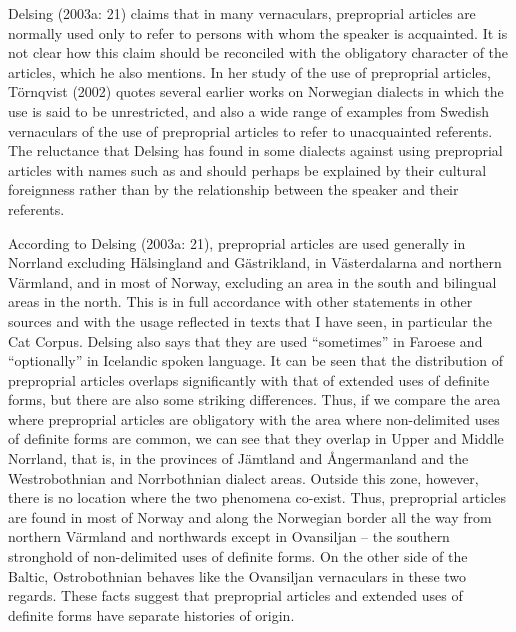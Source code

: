 Delsing (2003a: 21) claims that in many vernaculars, preproprial articles are normally used only to refer to persons with whom the speaker is acquainted. It is not clear how this claim should be reconciled with the obligatory character of the articles, which he also mentions. In her study of the use of preproprial articles, Törnqvist (2002) quotes several earlier works on Norwegian dialects in which the use is said to be unrestricted, and also a wide range of examples from Swedish vernaculars of the use of preproprial articles to refer to unacquainted referents. The reluctance that Delsing has found in some dialects against using preproprial articles with names such as  and  should perhaps be explained by their cultural foreignness rather than by the relationship between the speaker and their referents. 

According to Delsing (2003a: 21), preproprial articles are used generally in Norrland excluding Hälsingland and Gästrikland, in Västerdalarna and northern Värmland, and in most of Norway, excluding an area in the south and bilingual areas in the north. This is in full accordance with other statements in other sources and with the usage reflected in texts that I have seen, in particular the Cat Corpus. Delsing also says that they are used “sometimes” in Faroese and “optionally” in Icelandic spoken language. It can be seen that the distribution of preproprial articles overlaps significantly with that of extended uses of definite forms, but there are also some striking differences. Thus, if we compare the area where preproprial articles are obligatory with the area where non-delimited uses of definite forms are common, we can see that they overlap in Upper and Middle Norrland, that is, in the provinces of Jämtland and Ångermanland and the Westrobothnian and Norrbothnian dialect areas. Outside this zone, however, there is no location where the two phenomena co-exist. Thus, preproprial articles are found in most of Norway and along the Norwegian border all the way from northern Värmland and northwards except in Ovansiljan – the southern stronghold of non-delimited uses of definite forms. On the other side of the Baltic, Ostrobothnian behaves like the Ovansiljan vernaculars in these two regards. These facts suggest that preproprial articles and extended uses of definite forms have separate histories of origin.

